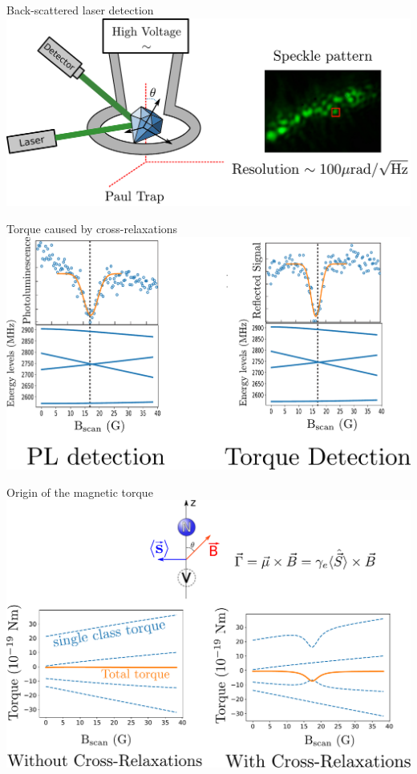 \documentclass{beamer}
\begin{document}
\begin{frame}{Back-scattered laser detection}
\centering
\includegraphics[scale=.3]{Trap_3}%
\end{frame}
\begin{frame}{Torque caused by cross-relaxations}
\centering
\includegraphics[scale=.4]{CRmeca_121}
\end{frame}
\begin{frame}{Origin of the magnetic torque}
\centering
\includegraphics[scale=.3]{Explication_torque}
\end{frame}
\end{document}
